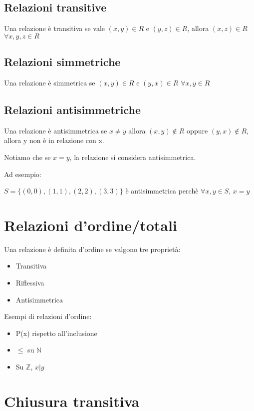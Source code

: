 \documentclass[a4paper]{article}
\begin{document}
\subsection{Relazioni transitive}

Una relazione è transitiva se vale $(x,y) \in R$ e $(y,z) \in R$, allora $(x,z) \in R$ $\forall x,y,z \in R$

\subsection{Relazioni simmetriche}

Una relazione è simmetrica se $(x,y) \in R$ e $(y,x) \in R$ $\forall x,y \in R$

\subsection{Relazioni antisimmetriche}

Una relazione è antisimmetrica se $x \neq y$ allora $(x,y) \notin R$ oppure $(y,x) \notin R$, allora y non è in relazione con x.

Notiamo che se $x=y$, la relazione si considera antisimmetrica.

Ad esempio:

$S=\{(0,0), (1,1), (2,2), (3,3)\}$ è antisimmetrica perchè $\forall x,y \in S$, $x=y$

\section{Relazioni d'ordine/totali}

Una relazione è definita d'ordine se valgono tre proprietà:

\begin{itemize}
	\item Transitiva
	\item Riflessiva
	\item Antisimmetrica
\end{itemize}

Esempi di relazioni d'ordine:

\begin{itemize}
	\item P(x) rispetto all'inclusione
	\item $\leq$ su $\mathbb{N}$
	\item Su $\mathbb{Z}$, $x|y$
\end{itemize}

\section{Chiusura transitiva}
\end{document}
